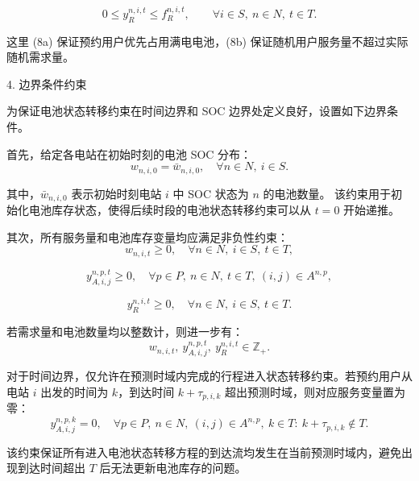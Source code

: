 \documentclass[12pt,hyperref,a4paper,UTF8]{ctexart}
\begin{document}
\begin{equation}
0\le y^{n,i,t}_{R}\le f^{n,i,t}_{R},
\qquad
\forall i\in S,\ n\in N,\ t\in T.
\tag{8b}
\end{equation}

这里 (8a) 保证预约用户优先占用满电电池，(8b) 保证随机用户服务量不超过实际随机需求量。


4. 边界条件约束


为保证电池状态转移约束在时间边界和 SOC 边界处定义良好，设置如下边界条件。

首先，给定各电站在初始时刻的电池 SOC 分布：
\begin{equation}
w_{n,i,0}=\bar{w}_{n,i,0},
\quad \forall n\in N,\ i\in S.
\tag{9a}
\end{equation}

其中，$\bar{w}_{n,i,0}$ 表示初始时刻电站 $i$ 中 SOC 状态为 $n$ 的电池数量。
该约束用于初始化电池库存状态，使得后续时段的电池状态转移约束可以从 $t=0$ 开始递推。

其次，所有服务量和电池库存变量均应满足非负性约束：
\begin{equation}
w_{n,i,t}\ge 0,
\quad \forall n\in N,\ i\in S,\ t\in T,
\tag{9b}
\end{equation}

\begin{equation}
y^{n,p,t}_{A,i,j}\ge 0,
\quad \forall p\in P,\ n\in N,\ t\in T,\ (i,j)\in A^{n,p},
\tag{9c}
\end{equation}

\begin{equation}
y^{n,i,t}_{R}\ge 0,
\quad \forall n\in N,\ i\in S,\ t\in T.
\tag{9d}
\end{equation}

若需求量和电池数量均以整数计，则进一步有：
\begin{equation}
w_{n,i,t},\ y^{n,p,t}_{A,i,j},\ y^{n,i,t}_{R}\in \mathbb{Z}_{+}.
\tag{9e}
\end{equation}



对于时间边界，仅允许在预测时域内完成的行程进入状态转移约束。若预约用户从电站 $i$ 出发的时间为 $k$，到达时间 $k+\tau_{p,i,k}$ 超出预测时域，则对应服务变量置为零：
\begin{equation}
y^{n,p,k}_{A,i,j}=0,
\quad
\forall p\in P,\ n\in N,\ (i,j)\in A^{n,p},\
k\in T:\ k+\tau_{p,i,k}\notin T.
\tag{9h}
\end{equation}

该约束保证所有进入电池状态转移方程的到达流均发生在当前预测时域内，避免出现到达时间超出 $T$ 后无法更新电池库存的问题。
\end{document}
